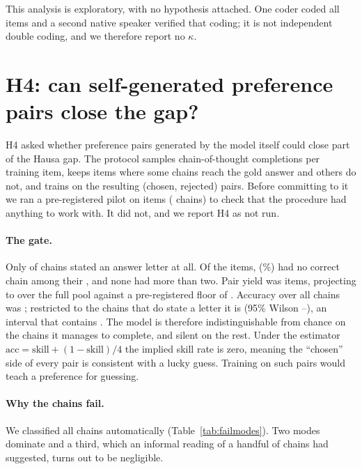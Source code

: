 \documentclass[11pt,a4paper]{article}
\begin{document}
This analysis is exploratory, with no hypothesis attached. One coder coded all
items and a second native speaker verified that coding; it is not independent
double coding, and we therefore report no $\kappa$.

\section{H4: can self-generated preference pairs close the gap?}

H4 asked whether preference pairs generated by the model itself could close
part of the Hausa gap. The protocol samples \GateK{} chain-of-thought
completions per training item, keeps items where some chains reach the gold
answer and others do not, and trains on the resulting (chosen, rejected) pairs.
Before committing to it we ran a pre-registered pilot on \GateItems{} items
(\GateSamples{} chains) to check that the procedure had anything to work with.
It did not, and we report H4 as not run.

\paragraph{The gate.}
Only \GateParse{} of chains stated an answer letter at all. Of the
\GateItems{} items, \GateZeroItems{} (\GateZeroPct{}\%) had no correct chain
among their \GateK{}, and none had more than two. Pair yield was
\GatePairs{} items, projecting to \GateProjected{} over the full pool against a
pre-registered floor of \GateThreshold{}. Accuracy over all chains was
\GateAcc{}; restricted to the \GateParsedN{} chains that do state a letter it is
\GateAccParsed{} (95\% Wilson \GateAccParsedLo{}--\GateAccParsedHi{}), an
interval that contains \Chance{}. The model is therefore indistinguishable from
chance on the chains it manages to complete, and silent on the rest. Under the
estimator $\mathrm{acc} = \mathrm{skill} + (1-\mathrm{skill})/4$ the implied
skill rate is zero, meaning the ``chosen'' side of every pair is consistent with
a lucky guess. Training on such pairs would teach a preference for guessing.

\paragraph{Why the chains fail.}
We classified all \FailChains{} chains automatically
(Table~\ref{tab:failmodes}). Two modes dominate and a third, which an informal
reading of a handful of chains had suggested, turns out to be negligible.
\end{document}
